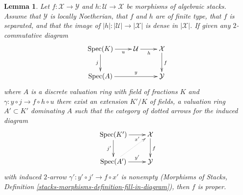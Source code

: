 \documentclass{stacks-project}
\theoremstyle{plain}
\newtheorem{lemma}[subsection]{Lemma}
\theoremstyle{definition}
\theoremstyle{remark}
\numberwithin{equation}{subsection}
\def\Spec{\mathop{\mathrm{Spec}}}
\begin{document}
\begin{lemma}
\label{lemma-refined-valuative-criterion-proper}
Let $f : \mathcal{X} \to \mathcal{Y}$ and $h : \mathcal{U} \to \mathcal{X}$
be morphisms of algebraic stacks. Assume that $\mathcal{Y}$ is
locally Noetherian, that $f$ and $h$ are of finite type,
that $f$ is separated, and that the image of
$|h| : |\mathcal{U}| \to |\mathcal{X}|$ is dense in $|\mathcal{X}|$.
If given any $2$-commutative diagram
$$
\xymatrix{
\Spec(K) \ar[r]_-u \ar[d]_j & \mathcal{U} \ar[r]_h & \mathcal{X} \ar[d]^f \\
\Spec(A) \ar[rr]^-y & & \mathcal{Y}
}
$$
where $A$ is a discrete valuation ring with field of fractions $K$
and $\gamma : y \circ j \to f \circ h \circ u$ there
exist an extension $K'/K$ of fields, a valuation ring $A' \subset K'$
dominating $A$ such that the category of dotted arrows for the
induced diagram
$$
\xymatrix{
\Spec(K') \ar[r]_-{x'} \ar[d]_{j'} & \mathcal{X} \ar[d]^f \\
\Spec(A') \ar[r]^-{y'} \ar@{..>}[ru] & \mathcal{Y}
}
$$
with induced $2$-arrow $\gamma' : y' \circ j' \to f \circ x'$
is nonempty (Morphisms of Stacks, Definition
\ref{stacks-morphisms-definition-fill-in-diagram}), then $f$ is proper.
\end{lemma}
\end{document}
